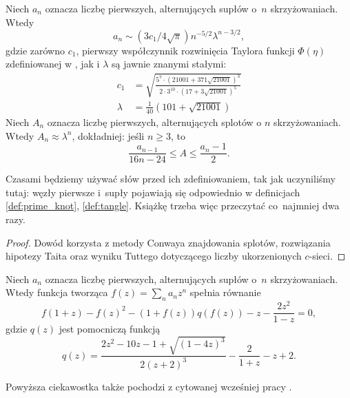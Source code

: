 \begin{proposition}
%
    Niech $a_n$ oznacza liczbę pierwszych, alternujących supłów o~$n$ skrzyżowaniach.
    Wtedy
    \begin{equation}
        a_n \sim (3c_1/4\sqrt{\pi})n^{-5/2}\lambda^{n-3/2},
    \end{equation}
    gdzie zarówno $c_1$, pierwszy współczynnik rozwinięcia Taylora funkcji $\Phi(\eta)$ zdefiniowanej w \cite{sundberg98}, jak i $\lambda$ są jawnie znanymi stałymi:
    \begin{align}
        c_1 & = \sqrt{\frac{5^7 \cdot (21001 + 371 \sqrt{21001})^3}{2 \cdot 3^{10} \cdot (17 + 3\sqrt{21001})^5}} \\
        \lambda & = \frac {1}{40} (101 + \sqrt{21001})
    \end{align}
    Niech $A_n$ oznacza liczbę pierwszych, alternujących splotów o $n$ skrzyżowaniach.
    Wtedy $A_n \approx \lambda^n$, dokładniej: jeśli $n \ge 3$, to
    \begin{equation}
        \frac{a_{n-1}}{16n - 24} \le A \le \frac{a_n - 1}{2}.
    \end{equation}
\end{proposition}

Czasami będziemy używać słów przed ich zdefiniowaniem, tak jak uczyniliśmy tutaj: węzły pierwsze i~supły pojawiają się odpowiednio w definicjach \ref{def:prime_knot}, \ref{def:tangle}.
Książkę trzeba więc przeczytać co~najmniej dwa razy.

\begin{proof}
%
%
%
    Dowód korzysta z metody Conwaya znajdowania splotów, rozwiązania hipotezy Taita oraz wyniku Tuttego dotyczącego liczby ukorzenionych $c$-sieci.
\end{proof}

\begin{proposition}
    Niech $a_n$ oznacza liczbę pierwszych, alternujących supłów o~$n$ skrzyżowaniach.
    Wtedy funkcja tworząca $f(z) = \sum_n a_n z^n$ spełnia równanie
    \begin{equation}
    f(1+z) - f(z)^2 - (1+f(z))q(f(z)) -z - \frac{2z^2}{1-z} = 0,
    \end{equation}
    gdzie $q(z)$ jest pomocniczą funkcją
    \begin{equation}
        q(z) = \frac{2z^2 - 10z - 1 + \sqrt{(1-4z)^3}} {2(z+2)^3} - \frac{2}{1+z} -z + 2.
    \end{equation}
\end{proposition}

Powyższa ciekawostka także pochodzi z cytowanej wcześniej pracy \cite{sundberg98}.

